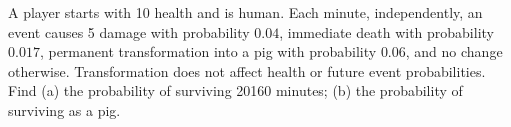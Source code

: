 A player starts with 10 health and is human. Each minute, independently, an event causes 5 damage with probability $0.04$, immediate death with probability $0.017$, permanent transformation into a pig with probability $0.06$, and no change otherwise. Transformation does not affect health or future event probabilities. Find (a) the probability of surviving 20160 minutes; (b) the probability of surviving as a pig.
